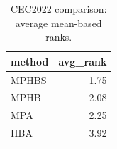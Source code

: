 \begin{table}[t]
\centering
\scriptsize
\caption{CEC2022 comparison: average mean-based ranks.}
\label{tab:cec2022_comparison_ranks}
\begin{tabular}{lr}
\toprule
method & avg\_rank \\
\midrule
MPHBS & 1.75 \\
MPHB & 2.08 \\
MPA & 2.25 \\
HBA & 3.92 \\
\bottomrule
\end{tabular}
\end{table}
